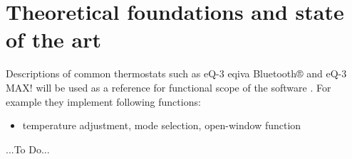%
%

\chapter{Theoretical foundations and state of the art}
\label{chap:Theoretical foundations and state of the art}
%
Descriptions of common thermostats such as eQ-3 eqiva Bluetooth® and eQ-3 MAX! will be used as a reference for functional scope of the software \cite{eQ3AG.05.2018} \cite{ELVjournal.2012}. For example they implement following functions:

\begin{itemize}
	\item temperature adjustment, mode selection, open-window function
\end{itemize}

...To Do...
